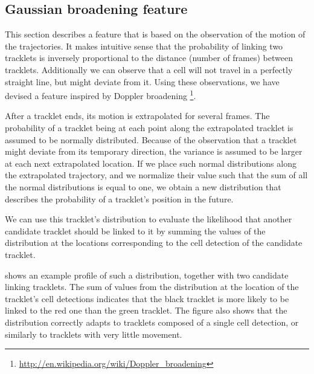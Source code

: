     	\subsection{Gaussian broadening feature}
    		\label{sec:gaussianbroadening}
    		This section describes a feature that is based on the observation of the motion of the trajectories. It makes intuitive sense that the probability of linking two tracklets is inversely proportional to the distance (number of frames) between tracklets. Additionally we can observe that a cell will not travel in a perfectly straight line, but might deviate from it. Using these observations, we have devised a feature inspired by Doppler broadening \footnote{\url{http://en.wikipedia.org/wiki/Doppler_broadening}}.
    		
    		After a tracklet ends, its motion is extrapolated for several frames. The probability of a tracklet being at each point along the extrapolated tracklet is assumed to be normally distributed. Because of the observation that a tracklet might deviate from its temporary direction, the variance is assumed to be larger at each next extrapolated location. If we place such normal distributions along the extrapolated trajectory, and we normalize their value such that the sum of all the normal distributions is equal to one, we obtain a new distribution that describes the probability of a tracklet's position in the future.
    		
    		We can use this tracklet's distribution to evaluate the likelihood that another candidate tracklet should be linked to it by summing the values of the distribution at the locations corresponding to the cell detection of the candidate tracklet.
    		
    		 shows an example profile of such a distribution, together with two candidate linking tracklets. The sum of values from the distribution at the location of the tracklet's cell detections indicates that the black tracklet is more likely to be linked to the red one than the green tracklet. The figure also shows that the distribution correctly adapts to tracklets composed of a single cell detection, or similarly to tracklets with very little movement.
	

